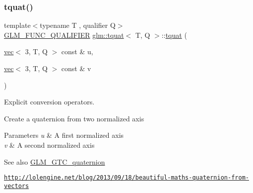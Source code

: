 \mbox{\label{structglm_1_1tquat_ad0b0aeae222fe05fb5d26fd40d74b9b6}} 
\subsubsection{\texorpdfstring{tquat()}{tquat()}\hspace{0.1cm}{\footnotesize\ttfamily [7/12]}}
{\footnotesize\ttfamily template$<$typename T , qualifier Q$>$ \\
\mbox{\hyperlink{setup_8hpp_a33fdea6f91c5f834105f7415e2a64407}{G\+L\+M\+\_\+\+F\+U\+N\+C\+\_\+\+Q\+U\+A\+L\+I\+F\+I\+ER}} \mbox{\hyperlink{structglm_1_1tquat}{glm\+::tquat}}$<$ T, Q $>$\+::\mbox{\hyperlink{structglm_1_1tquat}{tquat}} (\begin{DoxyParamCaption}\item[{\mbox{\hyperlink{structglm_1_1vec}{vec}}$<$ 3, T, Q $>$ const \&}]{u,  }\item[{\mbox{\hyperlink{structglm_1_1vec}{vec}}$<$ 3, T, Q $>$ const \&}]{v }\end{DoxyParamCaption})}



Explicit conversion operators. 

Create a quaternion from two normalized axis


\begin{DoxyParams}{Parameters}
{\em u} & A first normalized axis \\
\hline
{\em v} & A second normalized axis \\
\hline
\end{DoxyParams}
\begin{DoxySeeAlso}{See also}
\mbox{\hyperlink{group__gtc__quaternion}{G\+L\+M\+\_\+\+G\+T\+C\+\_\+quaternion}} 

\href{http://lolengine.net/blog/2013/09/18/beautiful-maths-quaternion-from-vectors}{\tt http\+://lolengine.\+net/blog/2013/09/18/beautiful-\/maths-\/quaternion-\/from-\/vectors} 
\end{DoxySeeAlso}
\mbox{\label{structglm_1_1tquat_a98289988d4e4970f9b45132f8f33759a}} 
